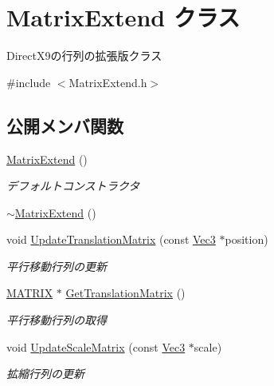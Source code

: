 \hypertarget{class_matrix_extend}{}\section{Matrix\+Extend クラス}
\label{class_matrix_extend}


Direct\+X9の行列の拡張版クラス  




{\ttfamily \#include $<$Matrix\+Extend.\+h$>$}

\subsection*{公開メンバ関数}
\begin{DoxyCompactItemize}
\item 
\mbox{\hyperlink{class_matrix_extend_a0058bf9dcf42d7f0c53b6fb3559b6a6e}{Matrix\+Extend}} ()
\begin{DoxyCompactList}\small\item\em デフォルトコンストラクタ \end{DoxyCompactList}\item 
\mbox{\hyperlink{class_matrix_extend_ae1d80dfa20420bdc58e85eccc525fe91}{$\sim$\+Matrix\+Extend}} ()
\item 
void \mbox{\hyperlink{class_matrix_extend_a6ca471ad3fea88a84fde7623c84f52f6}{Update\+Translation\+Matrix}} (const \mbox{\hyperlink{_vector3_d_8h_ab16f59e4393f29a01ec8b9bbbabbe65d}{Vec3}} $\ast$position)
\begin{DoxyCompactList}\small\item\em 平行移動行列の更新 \end{DoxyCompactList}\item 
\mbox{\hyperlink{_vector3_d_8h_a032295cd9fb1b711757c90667278e744}{M\+A\+T\+R\+IX}} $\ast$ \mbox{\hyperlink{class_matrix_extend_a95b114379190ca0fee5d40394f9842f1}{Get\+Translation\+Matrix}} ()
\begin{DoxyCompactList}\small\item\em 平行移動行列の取得 \end{DoxyCompactList}\item 
void \mbox{\hyperlink{class_matrix_extend_afc536ab192cd6ef2b9a93861af5bf005}{Update\+Scale\+Matrix}} (const \mbox{\hyperlink{_vector3_d_8h_ab16f59e4393f29a01ec8b9bbbabbe65d}{Vec3}} $\ast$scale)
\begin{DoxyCompactList}\small\item\em 拡縮行列の更新 \end{DoxyCompactList}\item 

\end{DoxyCompactItemize}
